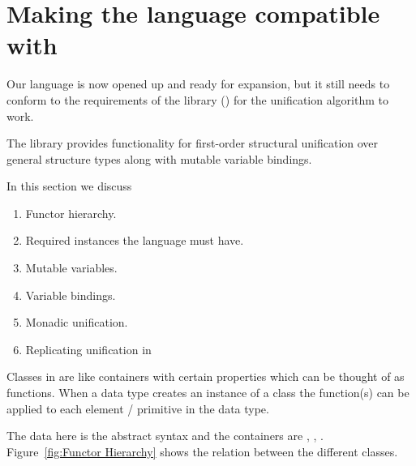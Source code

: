 \documentclass[thesis-solanki.tex]{subfiles}
\begin{document}
\section[Making the language compatible with \protect\codeLibrary{unification-fd}]{Making the language compatible with \newline{}}\label{sec:making-lang-comp}

Our language is now opened up and ready for expansion, but it still needs to conform to the requirements of the
 library (\cite{unification-fd-lib}) for the unification algorithm to work.

The library provides functionality for first-order structural unification over general structure types along with
mutable variable bindings.

In this section we discuss
\begin{enumerate}
\item Functor hierarchy.

\item Required instances the language must have.

\item Mutable variables.

\item Variable bindings.

\item Monadic unification.

\item Replicating  unification in 
\end{enumerate}

Classes in  are like containers with certain properties which can be thought of as functions. When a data type creates an
instance of a class the function(s) can be applied to each element / primitive in the data type.


The data here is the  abstract syntax and the containers are
, ,  
.
Figure~\ref{fig:Functor Hierarchy} shows the relation between the different classes.
\end{document}
